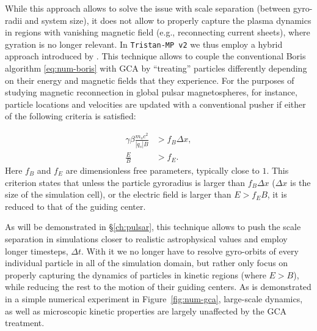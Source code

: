 While this approach allows to solve the issue with scale separation (between gyro-radii and system size), it does not allow to properly capture the plasma dynamics in regions with vanishing magnetic field (e.g., reconnecting current sheets), where gyration is no longer relevant. In \texttt{Tristan-MP v2} we thus employ a hybrid approach introduced by \cite{2020ApJS..251...10B}. This technique allows to couple the conventional Boris algorithm \eqref{eq:num-boris} with GCA by ``treating'' particles differently depending on their energy and magnetic fields that they experience. For the purposes of studying magnetic reconnection in global pulsar magnetospheres, for instance, particle locations and velocities are updated with a conventional pusher if either of the following criteria is satisfied:

\begin{equation}
    \begin{aligned}
        \gamma\beta \frac{m_s c^2}{|q_s| B} &> f_B \Delta x,\\
        \frac{E}{B} &> f_E.
    \end{aligned}
\end{equation}
\noindent Here $f_B$ and $f_E$ are dimensionless free parameters, typically close to $1$. This criterion states that unless the particle gyroradius is larger than $f_B\Delta x$ ($\Delta x$ is the size of the simulation cell), or the electric field is larger than $E>f_E B$, it is reduced to that of the guiding center.

As will be demonstrated in \S\ref{ch:pulsar}, this technique allows to push the scale separation in simulations closer to realistic astrophysical values and employ longer timesteps, $\Delta t$. With it we no longer have to resolve gyro-orbits of every individual particle in all of the simulation domain, but rather only focus on properly capturing the dynamics of particles in kinetic regions (where $E>B$), while reducing the rest to the motion of their guiding centers. As is demonstrated in a simple numerical experiment in Figure~\ref{fig:num-gca}, large-scale dynamics, as well as microscopic kinetic properties are largely unaffected by the GCA treatment. 

